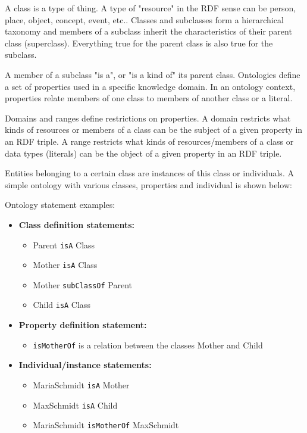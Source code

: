 A class is a type of thing. A type of "resource" in the RDF sense can be
person, place, object, concept, event, etc.. Classes and subclasses form a hierarchical taxonomy and members of a subclass inherit the characteristics of their parent class (superclass). Everything true for the parent class is also true for the subclass.

A member of a subclass "is a", or "is a kind of" its parent class. Ontologies define a set of properties used in a specific knowledge domain. In an ontology context, properties relate members of one class to members of another class or a literal.

Domains and ranges define restrictions on properties. A domain restricts what kinds of resources or members of a class can be the subject of a given property in an RDF triple. A range restricts what kinds of resources/members of a class or data types (literals) can be the object of a given property in an RDF triple.

Entities belonging to a certain class are instances of this class or individuals. A simple ontology with various classes, properties and individual is shown below:

Ontology statement examples:

\begin{itemize}
	\item \textbf {Class definition statements:}
	\begin{itemize}
		\item Parent \texttt{isA} Class
		\item Mother \texttt{isA} Class
		\item Mother \texttt{subClassOf} Parent
		\item Child \texttt{isA} Class
	\end{itemize}
	\item \textbf {Property definition statement:}
	\begin{itemize}
		\item \texttt{isMotherOf} is a relation between the classes Mother and Child
	\end{itemize}
	\item \textbf{Individual/instance statements:}
	\begin{itemize}
		\item MariaSchmidt \texttt{isA} Mother
		\item MaxSchmidt \texttt{isA} Child
		\item MariaSchmidt \texttt{isMotherOf} MaxSchmidt
	\end{itemize}
\end{itemize}

